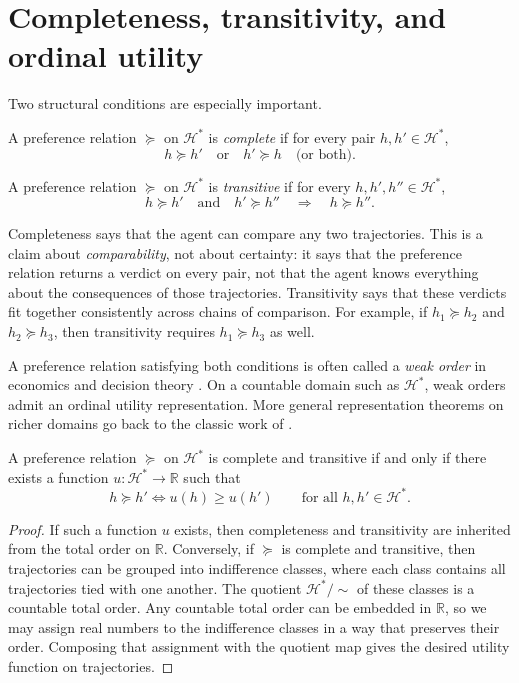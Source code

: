 \documentclass[11pt]{article}
\newcommand{\Hcal}{\mathcal{H}}
\newcommand{\R}{\mathbb{R}}
\newcommand{\pref}{\succcurlyeq}
\newcommand{\indiff}{\sim}
\begin{document}
\newpage

\section{Completeness, transitivity, and ordinal utility}

Two structural conditions are especially important.

\begin{definition}[Completeness]
A preference relation $\pref$ on $\Hcal^*$ is \emph{complete} if for every pair
$h,h'\in \Hcal^*$,
\[
h\pref h' \quad \text{or} \quad h'\pref h \quad \text{(or both)}.
\]
\end{definition}

\begin{definition}[Transitivity]
A preference relation $\pref$ on $\Hcal^*$ is \emph{transitive} if for every
$h,h',h''\in \Hcal^*$,
\[
h\pref h' \quad \text{and} \quad h'\pref h'' \quad \Longrightarrow \quad h\pref h''.
\]
\end{definition}

Completeness says that the agent can compare any two trajectories. This is a
claim about \emph{comparability}, not about certainty: it says that the
preference relation returns a verdict on every pair, not that the agent knows
everything about the consequences of those trajectories. Transitivity says that
these verdicts fit together consistently across chains of comparison. For
example, if $h_1\pref h_2$ and $h_2\pref h_3$, then transitivity requires
$h_1\pref h_3$ as well.

A preference relation satisfying both conditions is often called a
\emph{weak order} in economics and decision theory
\citep{fishburn1970utility,kreps1988notes,mascolell1995micro}. On a countable
domain such as $\Hcal^*$, weak orders admit an ordinal utility
representation. More general representation theorems on richer domains go back
to the classic work of \citet{debreu1954representation}.

\begin{proposition}
\label{prop:ordinal_representation}
A preference relation $\pref$ on $\Hcal^*$ is complete and transitive if and
only if there exists a function $u\colon \Hcal^* \to \R$ such that
\[
h \pref h' \iff u(h)\geq u(h')
\qquad
\text{for all } h,h'\in\Hcal^*.
\]
\end{proposition}

\begin{proof}
If such a function $u$ exists, then completeness and transitivity are inherited
from the total order on $\R$. Conversely, if $\pref$ is complete and
transitive, then trajectories can be grouped into indifference classes, where
each class contains all trajectories tied with one another. The quotient
$\Hcal^*/{\indiff}$ of these classes is a countable total order. Any countable
total order can be embedded in $\R$, so we may assign real numbers to the
indifference classes in a way that preserves their order. Composing that
assignment with the quotient map gives the desired utility function on
trajectories.
\end{proof}
\end{document}
